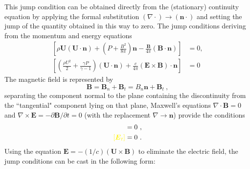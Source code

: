 \documentclass[12pt,a4paper]{article}
\renewcommand{\vec}[1]{\boldsymbol{#1}}
\begin{document}
This jump condition can be obtained directly from the (stationary) continuity equation by applying the formal substitution $(\nabla \cdot) \rightarrow (\vec{n} \cdot)$ and setting the jump of the quantity obtained in this way to zero. The jump conditions deriving from the momentum and energy equations
\begin{align}
\left[\rho \vec{U}(\vec{U}\cdot \vec{n}) + \left(P +\frac{B^2}{8\pi} \right) \vec{n} -\frac{\vec{B}}{4\pi} \left(\vec{B}\cdot \vec{n}\right) \right] &= 0, \\
\left[\left(\frac{\rho U^2}{2} +\frac{\gamma P}{\gamma -1} \right) (\vec{U} \cdot \vec{n}) +\frac{c}{4\pi} (\vec{E} \times \vec{B}) \cdot \vec{n} \right] &= 0
\end{align}
The magnetic field is represented by
\begin{equation}
\vec{B} = \vec{B}_n +\vec{B}_t = B_n \vec{n} +\vec{B}_t ~,
\end{equation}
separating the component normal to the plane containing the discontinuity from the ``tangential" component lying on that plane, Maxwell's equations $\nabla \cdot \vec{B} = 0$ and $\nabla \times \vec{E} = -\partial \vec{B}/\partial t = 0$ (with
the replacement $\nabla \rightarrow \vec{n}$) provide the conditions
\begin{align*}
[B_n ] &= 0 ~, \\
\color{yellow} [\vec{E}_t] &= 0 ~.
\end{align*}
Using the equation $\vec{E} = -(1/c)(\vec{U} \times \vec{B})$ to eliminate the electric field, the jump conditions can be cast in the following form:
\end{document}
